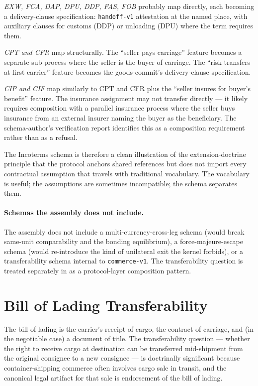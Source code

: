 \documentclass[11pt,a4paper]{article}
\theoremstyle{definition}
\theoremstyle{remark}
\begin{document}
\emph{EXW, FCA, DAP, DPU, DDP, FAS, FOB} probably map directly,
each becoming a delivery-clause specification: \texttt{handoff-v1}
attestation at the named place, with auxiliary clauses for
customs (DDP) or unloading (DPU) where the term requires them.

\emph{CPT and CFR} map structurally. The ``seller pays carriage''
feature becomes a separate sub-process where the seller is the
buyer of carriage. The ``risk transfers at first carrier''
feature becomes the goods-commit's delivery-clause specification.

\emph{CIP and CIF} map similarly to CPT and CFR plus the
``seller insures for buyer's benefit'' feature. The insurance
assignment may not transfer directly --- it likely requires
composition with a parallel insurance process where the seller
buys insurance from an external insurer naming the buyer as the
beneficiary. The schema-author's verification report identifies
this as a composition requirement rather than as a refusal.

The Incoterms schema is therefore a clean illustration of the
extension-doctrine principle that the protocol anchors shared
references but does not import every contractual assumption that
travels with traditional vocabulary. The vocabulary is useful;
the assumptions are sometimes incompatible; the schema separates
them.

\paragraph{Schemas the assembly does not include.}
The assembly does not include a multi-currency-cross-leg schema
(would break same-unit comparability and the bonding equilibrium),
a force-majeure-escape schema (would re-introduce the kind of
unilateral exit the kernel forbids), or a transferability schema
internal to \texttt{commerce-v1}. The transferability question is
treated separately in  as a protocol-layer
composition pattern.

\section{Bill of Lading Transferability}
\label{sec:bol}

The bill of lading is the carrier's receipt of cargo, the
contract of carriage, and (in the negotiable case) a document of
title. The transferability question --- whether the right to
receive cargo at destination can be transferred mid-shipment from
the original consignee to a new consignee --- is doctrinally
significant because container-shipping commerce often involves
cargo sale in transit, and the canonical legal artifact for that
sale is endorsement of the bill of lading.
\end{document}
